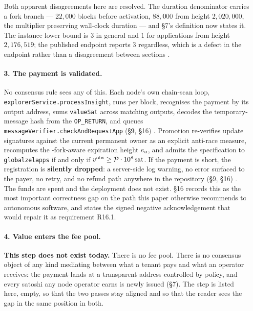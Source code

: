 Both apparent disagreements here are resolved. The duration denominator carries a \PoN{} fork branch --- $22{,}000$ blocks before activation, $88{,}000$ from height $2{,}020{,}000$, the multiplier preserving wall-clock duration --- and \S7's definition now states it. The instance lower bound is $3$ in general and $1$ for  applications from height $2{,}176{,}519$; the published endpoint reports $3$ regardless, which is a defect in the endpoint rather than a disagreement between sections .

\paragraph{3. The payment is validated.}
No consensus rule sees any of this. Each node's own chain-scan loop,
\texttt{explorerService.\allowbreak{}processInsight}, runs per block, recognises the payment by its output
address, sums \texttt{valueSat} across matching outputs, decodes the temporary-message hash from the
\texttt{OP\_RETURN}, and queues \texttt{messageVerifier.\allowbreak{}checkAndRequestApp} (\S9, \S16)
. Promotion re-verifies update
signatures against the current permanent owner as an explicit anti-race measure, recomputes the
\PoN-fork-aware expiration height $e_{a}$, and admits the specification to \texttt{globalzelapps}
if and only if $v^{\mathrm{obs}} \ge \mathcal{P} \cdot 10^{8}\,\mathrm{sat}$. If the payment is short, the
registration is \textbf{silently dropped}: a server-side log warning, no error surfaced to the payer,
no retry, and no refund path anywhere in the repository (\S9, \S16)
. The funds are spent
and the deployment does not exist. \S16 records this as the most important correctness gap on the
path this paper otherwise recommends to autonomous software, and states the signed negative
acknowledgement that would repair it as requirement R16.1.

\paragraph{4. Value enters the fee pool.}
\textbf{This step does not exist today.} There is no fee pool. There is no consensus object of any
kind mediating between what a tenant pays and what an operator receives: the payment lands at a
transparent address controlled by policy, and every satoshi any node operator earns is newly issued
(\S7). The step is listed here, empty, so that the two passes stay aligned and so that the reader
sees the gap in the same position in both.

